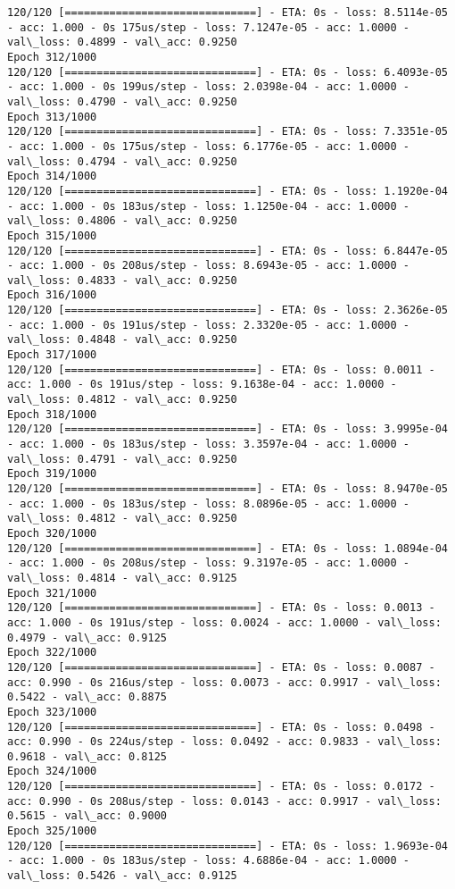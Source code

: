\documentclass[11pt]{article}
\begin{document}
\begin{Verbatim}[commandchars=\\\{\}]
120/120 [==============================] - ETA: 0s - loss: 8.5114e-05 - acc: 1.000 - 0s 175us/step - loss: 7.1247e-05 - acc: 1.0000 - val\_loss: 0.4899 - val\_acc: 0.9250
Epoch 312/1000
120/120 [==============================] - ETA: 0s - loss: 6.4093e-05 - acc: 1.000 - 0s 199us/step - loss: 2.0398e-04 - acc: 1.0000 - val\_loss: 0.4790 - val\_acc: 0.9250
Epoch 313/1000
120/120 [==============================] - ETA: 0s - loss: 7.3351e-05 - acc: 1.000 - 0s 175us/step - loss: 6.1776e-05 - acc: 1.0000 - val\_loss: 0.4794 - val\_acc: 0.9250
Epoch 314/1000
120/120 [==============================] - ETA: 0s - loss: 1.1920e-04 - acc: 1.000 - 0s 183us/step - loss: 1.1250e-04 - acc: 1.0000 - val\_loss: 0.4806 - val\_acc: 0.9250
Epoch 315/1000
120/120 [==============================] - ETA: 0s - loss: 6.8447e-05 - acc: 1.000 - 0s 208us/step - loss: 8.6943e-05 - acc: 1.0000 - val\_loss: 0.4833 - val\_acc: 0.9250
Epoch 316/1000
120/120 [==============================] - ETA: 0s - loss: 2.3626e-05 - acc: 1.000 - 0s 191us/step - loss: 2.3320e-05 - acc: 1.0000 - val\_loss: 0.4848 - val\_acc: 0.9250
Epoch 317/1000
120/120 [==============================] - ETA: 0s - loss: 0.0011 - acc: 1.000 - 0s 191us/step - loss: 9.1638e-04 - acc: 1.0000 - val\_loss: 0.4812 - val\_acc: 0.9250
Epoch 318/1000
120/120 [==============================] - ETA: 0s - loss: 3.9995e-04 - acc: 1.000 - 0s 183us/step - loss: 3.3597e-04 - acc: 1.0000 - val\_loss: 0.4791 - val\_acc: 0.9250
Epoch 319/1000
120/120 [==============================] - ETA: 0s - loss: 8.9470e-05 - acc: 1.000 - 0s 183us/step - loss: 8.0896e-05 - acc: 1.0000 - val\_loss: 0.4812 - val\_acc: 0.9250
Epoch 320/1000
120/120 [==============================] - ETA: 0s - loss: 1.0894e-04 - acc: 1.000 - 0s 208us/step - loss: 9.3197e-05 - acc: 1.0000 - val\_loss: 0.4814 - val\_acc: 0.9125
Epoch 321/1000
120/120 [==============================] - ETA: 0s - loss: 0.0013 - acc: 1.000 - 0s 191us/step - loss: 0.0024 - acc: 1.0000 - val\_loss: 0.4979 - val\_acc: 0.9125
Epoch 322/1000
120/120 [==============================] - ETA: 0s - loss: 0.0087 - acc: 0.990 - 0s 216us/step - loss: 0.0073 - acc: 0.9917 - val\_loss: 0.5422 - val\_acc: 0.8875
Epoch 323/1000
120/120 [==============================] - ETA: 0s - loss: 0.0498 - acc: 0.990 - 0s 224us/step - loss: 0.0492 - acc: 0.9833 - val\_loss: 0.9618 - val\_acc: 0.8125
Epoch 324/1000
120/120 [==============================] - ETA: 0s - loss: 0.0172 - acc: 0.990 - 0s 208us/step - loss: 0.0143 - acc: 0.9917 - val\_loss: 0.5615 - val\_acc: 0.9000
Epoch 325/1000
120/120 [==============================] - ETA: 0s - loss: 1.9693e-04 - acc: 1.000 - 0s 183us/step - loss: 4.6886e-04 - acc: 1.0000 - val\_loss: 0.5426 - val\_acc: 0.9125

\end{Verbatim}
\end{document}
